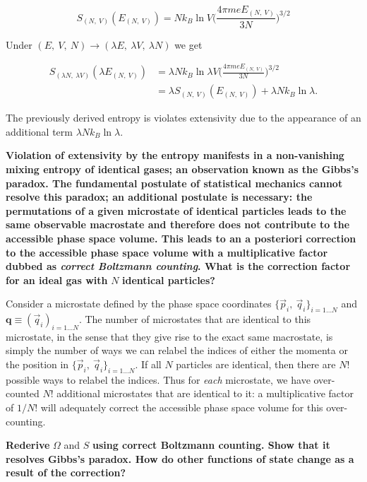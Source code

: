 \documentclass[11pt]{article}
\begin{document}
\[
S_{(N,~V)}(E_{(N,~V)}) = N k_{B} \ln V \bigg(\frac{4 \pi m e E_{(N,~V)}}{3 N}\bigg)^{3/2}
\]

Under \((E,~V,~N) \rightarrow (\lambda E,~\lambda V,~\lambda N)\) we get

\begin{align*}
S_{(\lambda N,~\lambda V)}( \lambda E_{(N,~V)}) &= \lambda N k_{B} \ln \lambda V \bigg(\frac{4 \pi m e E_{(N,~V)}}{3 N}\bigg)^{3/2} \\
&= \lambda S_{(N,~V)} (E_{(N,~V)}) + \lambda N k_{B} \ln \lambda.
\end{align*}

The previously derived entropy is violates extensivity due to the appearance of an additional term \(\lambda N k_{B} \ln \lambda\).
\label{sec:orgae081b5}

\textbf{Violation of extensivity by the entropy manifests in a non-vanishing mixing entropy of identical gases; an observation known as the Gibbs's paradox. The fundamental postulate of statistical mechanics cannot resolve this paradox; an additional postulate is necessary: the permutations of a given microstate of identical particles leads to the same observable macrostate and therefore does not contribute to the accessible phase space volume. This leads to an a posteriori correction to the accessible phase space volume with a multiplicative factor dubbed as \emph{correct Boltzmann counting}. What is the correction factor for an ideal gas with} \(N\) \textbf{identical particles?}

Consider a microstate defined by the phase space coordinates \(\{\vec{p}_{i},~\vec{q}_{i}\}_{i=1\ldots N}\) and \(\mathbf{q} \equiv (\vec{q}_{i})_{i=1\ldots N}\). The number of microstates that are identical to this microstate, in the sense that they give rise to the exact same macrostate, is simply the number of ways we can relabel the indices of either the momenta or the position in \(\{\vec{p}_{i},~\vec{q}_{i}\}_{i=1\ldots N}\). If all \(N\) particles are identical, then there are \(N!\) possible ways to relabel the indices. Thus for \emph{each} microstate, we have over-counted \(N!\) additional microstates that are identical to it: a multiplicative factor of \(1/ N!\) will adequately correct the accessible phase space volume for this over-counting.
\label{sec:orge11e73b}

\textbf{Rederive} \(\Omega\) and \(S\) \textbf{using correct Boltzmann counting. Show that it resolves Gibbs's paradox. How do other functions of state change as a result of the correction?}
\end{document}
